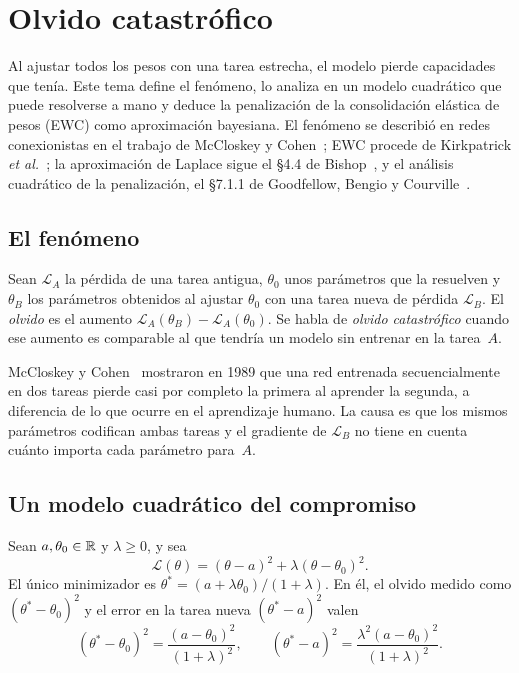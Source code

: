 \chapter{Olvido catastrófico}
\label{tema:3}

Al ajustar todos los pesos con una tarea estrecha, el modelo pierde capacidades que tenía. Este tema define el fenómeno, lo analiza en un modelo cuadrático que puede resolverse a mano y deduce la penalización de la consolidación elástica de pesos (EWC) como aproximación bayesiana. El fenómeno se describió en redes conexionistas en el trabajo de McCloskey y Cohen~\cite{mccloskey}; EWC procede de Kirkpatrick \emph{et al.}~\cite{kirkpatrick}; la aproximación de Laplace sigue el §4.4 de Bishop~\cite{bishop}, y el análisis cuadrático de la penalización, el §7.1.1 de Goodfellow, Bengio y Courville~\cite{gbc}.

\section{El fenómeno}

\begin{definicion}[Olvido]\label{def:olvido}
Sean $\mathcal{L}_A$ la pérdida de una tarea antigua, $\theta_0$ unos parámetros que la resuelven y $\theta_B$ los parámetros obtenidos al ajustar $\theta_0$ con una tarea nueva de pérdida $\mathcal{L}_B$. El \emph{olvido} es el aumento $\mathcal{L}_A(\theta_B)-\mathcal{L}_A(\theta_0)$. Se habla de \emph{olvido catastrófico} cuando ese aumento es comparable al que tendría un modelo sin entrenar en la tarea~$A$.
\end{definicion}

McCloskey y Cohen~\cite{mccloskey} mostraron en 1989 que una red entrenada secuencialmente en dos tareas pierde casi por completo la primera al aprender la segunda, a diferencia de lo que ocurre en el aprendizaje humano. La causa es que los mismos parámetros codifican ambas tareas y el gradiente de $\mathcal{L}_B$ no tiene en cuenta cuánto importa cada parámetro para~$A$.

\addtocounter{definicion}{1}%

\section{Un modelo cuadrático del compromiso}

\begin{proposicion}\label{prop:muelle}
Sean $a,\theta_0\in\mathbb{R}$ y $\lambda\ge 0$, y sea
\[
\mathcal{L}(\theta)=(\theta-a)^{2}+\lambda(\theta-\theta_0)^{2}.
\]
El único minimizador es $\theta^{\ast}=(a+\lambda\theta_0)/(1+\lambda)$. En él, el olvido medido como $(\theta^{\ast}-\theta_0)^{2}$ y el error en la tarea nueva $(\theta^{\ast}-a)^{2}$ valen
\[
(\theta^{\ast}-\theta_0)^{2}=\frac{(a-\theta_0)^{2}}{(1+\lambda)^{2}},\qquad (\theta^{\ast}-a)^{2}=\frac{\lambda^{2}(a-\theta_0)^{2}}{(1+\lambda)^{2}}.
\]
\end{proposicion}

